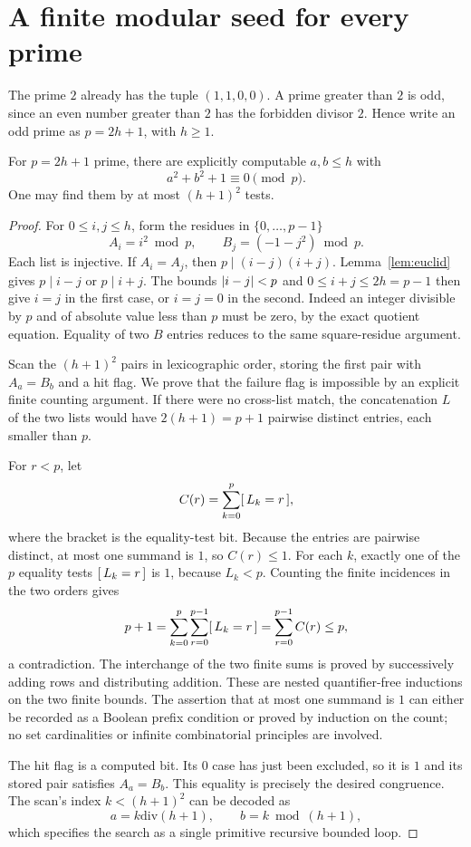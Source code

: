 \section{A finite modular seed for every prime}
\label{sec:seed}

The prime $2$ already has the tuple $(1,1,0,0)$. A prime greater than $2$
is odd, since an even number greater than $2$ has the forbidden divisor
$2$. Hence write an odd prime as $p=2h+1$, with $h\ge1$.

\begin{lemma}
\label{lem:residue}
For $p=2h+1$ prime, there are explicitly computable $a,b\le h$ with
\[
 a^2+b^2+1\equiv0\pmod p.
\]
One may find them by at most $(h+1)^2$ tests.
\end{lemma}

\begin{proof}
For $0\le i,j\le h$, form the residues in $\{0,\ldots,p-1\}$
\[
 A_i=i^2\bmod p,\qquad B_j=(-1-j^2)\bmod p.
\]
Each list is injective. If $A_i=A_j$, then
$p\mid(i-j)(i+j)$. Lemma~\ref{lem:euclid} gives $p\mid i-j$ or
$p\mid i+j$. The bounds $\lvert i-j\rvert<p$ and $0\le i+j\le2h=p-1$
then give $i=j$ in the first case, or $i=j=0$ in the second.
Indeed an integer divisible by $p$ and of absolute value less than $p$
must be zero, by the exact quotient equation. Equality of two $B$ entries
reduces to the same square-residue argument.

Scan the $(h+1)^2$ pairs in lexicographic order, storing the first pair
with $A_a=B_b$ and a hit flag. We prove that the failure flag is impossible
by an explicit finite counting argument. If there were no cross-list
match, the concatenation $L$ of the two lists would have
$2(h+1)=p+1$ pairwise distinct entries, each smaller than $p$.

For $r<p$, let
\[
 C(r)=\sum_{k=0}^{p}[\,L_k=r\,],
\]
where the bracket is the equality-test bit. Because the entries are
pairwise distinct, at most one summand is $1$, so $C(r)\le1$.
For each $k$, exactly one of the $p$ equality tests $[\,L_k=r\,]$ is $1$,
because $L_k<p$. Counting the finite incidences in the two orders gives
\begin{equation}
\label{eq:count}
 p+1
 =\sum_{k=0}^{p}\sum_{r=0}^{p-1}[\,L_k=r\,]
 =\sum_{r=0}^{p-1}C(r)
 \le p,
\end{equation}
a contradiction. The interchange of the two finite sums is proved by
successively adding rows and distributing addition. These are nested
quantifier-free inductions on the two finite bounds. The assertion that
at most one summand is $1$ can either be recorded as a Boolean prefix
condition or proved by induction on the count; no set cardinalities or
infinite combinatorial principles are involved.

The hit flag is a computed bit. Its $0$ case has just been excluded, so it
is $1$ and its stored pair satisfies $A_a=B_b$. This equality is precisely
the desired congruence. The scan's index $k<(h+1)^2$ can be decoded as
\[
 a=k\mathbin{\mathrm{div}}(h+1),\qquad b=k\bmod(h+1),
\]
which specifies the search as a single primitive recursive bounded loop.
\end{proof}

